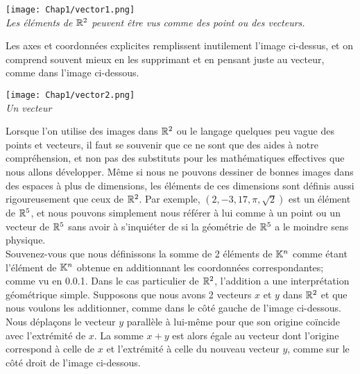 \documentclass[12pt]{book}
\theoremstyle{plain}
\begin{document}
\begin{center}
    \texttt{[image: Chap1/vector1.png]}\\
    \textit{Les éléments de $\mathbb{R}^2$ peuvent être vus comme des point ou des vecteurs.}
\end{center}
\noindent
Les axes et coordonnées explicites remplissent inutilement l'image ci-dessus, et on comprend souvent mieux en les supprimant et en pensant juste au vecteur, comme dans l'image ci-dessous.\\

\begin{center}
    \texttt{[image: Chap1/vector2.png]}\\
    \textit{Un vecteur}
\end{center}


Lorsque l'on utilise des images dans $\mathbb{R}^2$ ou le langage quelques peu vague des points et vecteurs, il faut se souvenir que ce ne sont que des aides à notre compréhension, et non pas des substituts pour les mathématiques effectives que nous allons développer. Même si nous ne pouvons dessiner de bonnes images dans des espaces à plus de dimensions, les éléments de ces dimensions sont définis aussi rigoureusement que ceux de $\mathbb{R}^2$. Par exemple, $(2,-3,17,\pi,\sqrt{2})$ est un élément de $\mathbb{R}^5$, et nous pouvons simplement nous référer à lui comme à un point ou un vecteur de $\mathbb{R}^5$ sans avoir à s'inquiéter de si la géométrie de $\mathbb{R}^5$ a le moindre sens physique.\\

\indent{}
Souvenez-vous que nous définissons la somme de 2 éléments de $\mathbb{K}^n$ comme étant l'élément de $\mathbb{K}^n$ obtenue en additionnant les coordonnées correspondantes; comme vu en 0.0.1. Dans le cas particulier de $\mathbb{R}^2$, l'addition a une interprétation géométrique simple. Supposons que nous avons 2 vecteurs $x$ et $y$ dans $\mathbb{R}^2$ et que nous voulons les additionner, comme dans le côté gauche de l'image ci-dessous. Nous déplaçons le vecteur $y$ parallèle à lui-même pour que son origine coïncide avec l'extrémité de $x$. La somme $x+y$ est alors égale au vecteur dont l'origine correspond à celle de $x$ et l'extrémité à celle du nouveau vecteur $y$, comme sur le côté droit de l'image ci-dessous.\\
\end{document}
